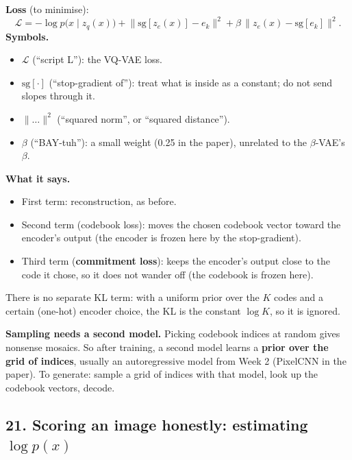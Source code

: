 \textbf{Loss} (to minimise):
\[
\mathcal{L} = -\log p\big(x \mid z_q(x)\big) + \big\|\mathrm{sg}[z_e(x)] - e_k\big\|^2 + \beta\,\big\|z_e(x) - \mathrm{sg}[e_k]\big\|^2.
\]
\textbf{Symbols.}
\begin{itemize}[leftmargin=1.5em, itemsep=0pt]
\item $\mathcal{L}$ (``script L''): the VQ-VAE loss.
\item $\mathrm{sg}[\cdot]$ (``stop-gradient of''): treat what is inside as a constant; do not send slopes through it.
\item $\|\ldots\|^2$ (``squared norm'', or ``squared distance'').
\item $\beta$ (``BAY-tuh''): a small weight (0.25 in the paper), unrelated to the $\beta$-VAE's $\beta$.
\end{itemize}
\textbf{What it says.}
\begin{itemize}[leftmargin=1.5em]
\item First term: reconstruction, as before.
\item Second term (codebook loss): moves the chosen codebook vector toward the encoder's output (the encoder is frozen here by the stop-gradient).
\item Third term (\textbf{commitment loss}): keeps the encoder's output close to the code it chose, so it does not wander off (the codebook is frozen here).
\end{itemize}
There is no separate KL term: with a uniform prior over the $K$ codes and a certain (one-hot) encoder choice, the KL is the constant $\log K$, so it is ignored.

\textbf{Sampling needs a second model.} Picking codebook indices at random gives nonsense mosaics. So after training, a second model learns a \textbf{prior over the grid of indices}, usually an autoregressive model from Week 2 (PixelCNN in the paper). To generate: sample a grid of indices with that model, look up the codebook vectors, decode.

\subsection*{21. Scoring an image honestly: estimating $\log p(x)$}

